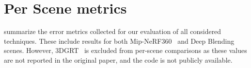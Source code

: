 \vfill

\section{Per Scene metrics}


 summarize the error metrics collected for our evaluation of all considered techniques.
These include results for both Mip-NeRF360~\cite{mipnerf360} and Deep Blending~\cite{deepblending} scenes.
However, 3DGRT~\cite{3dgrt} is excluded from per-scene comparisons as these values are not reported in the original paper, and the code is not publicly available.

\vspace{33em}
\hfill

~
\vspace{42em}
